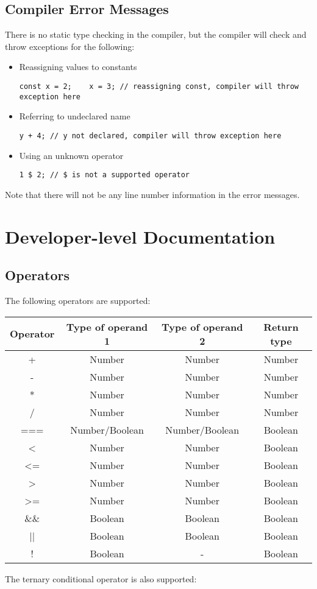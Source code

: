 \subsection{Compiler Error Messages}
There is no static type checking in the compiler, but the compiler will check and throw exceptions for the following: 
\begin{itemize}
\item Reassigning values to constants
\begin{verbatim}
const x = 2;    x = 3; // reassigning const, compiler will throw exception here
\end{verbatim}
\item Referring to undeclared name
\begin{verbatim}
y + 4; // y not declared, compiler will throw exception here
\end{verbatim}
\item Using an unknown operator
\begin{verbatim}
1 $ 2; // $ is not a supported operator
\end{verbatim}

\end{itemize}
Note that there will not be any line number information in the error messages. 
\pagebreak
\section{Developer-level Documentation}
\subsection{Operators}
The following operators are supported: 
\begin{center}
  \begin{tabular}{|c | c | c | c|} 
   \hline
   Operator & Type of operand 1 & Type of operand 2 & Return type \\ 
   \hline\hline
   + & Number & Number & Number \\ 
   \hline
   - & Number & Number & Number \\ 
   \hline
   * & Number & Number & Number \\ 
   \hline
   / & Number & Number & Number \\ 
   \hline
   === & Number/Boolean & Number/Boolean & Boolean \\ 
   \hline
   < & Number & Number & Boolean \\ 
   \hline
   <= & Number & Number & Boolean \\ 
   \hline
   > & Number & Number & Boolean \\ 
   \hline
   >= & Number & Number & Boolean \\ 
   \hline
   \&\& & Boolean & Boolean & Boolean \\ 
   \hline
   || & Boolean & Boolean & Boolean \\ 
   \hline
   ! & Boolean & - & Boolean \\ 
   \hline
  \end{tabular}
\end{center}
The ternary conditional operator is also supported: \\

